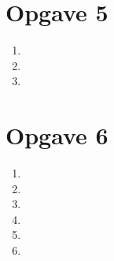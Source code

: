 \documentclass{article}
\begin{document}
    \section*{Opgave 5}
        \begin{enumerate}
            \item
            \item
            \item
        \end{enumerate}

    \section*{Opgave 6}
        \begin{enumerate}
            \item
            \item
            \item
            \item
            \item
            \item
        \end{enumerate}
\end{document}
